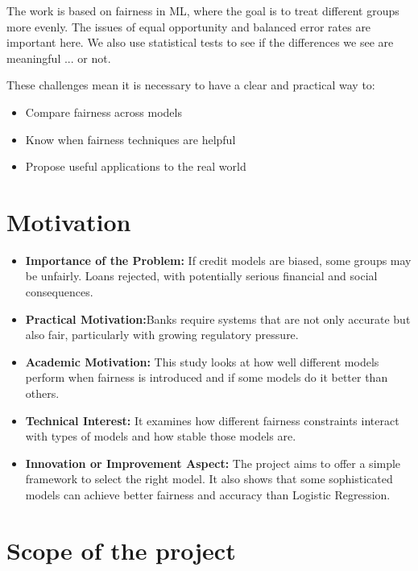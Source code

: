 The work is based on fairness in ML, where the goal is to treat different groups
more evenly. The issues of equal opportunity and balanced error rates are important here.
We also use statistical tests to see if the differences we see are meaningful
... or not.

These challenges mean it is necessary to have a clear and practical way to:
\begin{itemize}
    \item Compare fairness across models
    \item Know when fairness techniques are helpful
    \item Propose useful applications to the real world
\end{itemize}
\section{Motivation}

\begin{itemize}
    \item \textbf{Importance of the Problem:} If credit models are biased, some groups may be unfairly. Loans rejected, with potentially serious financial and social consequences.
    
    \item \textbf{Practical Motivation:}Banks require systems that are not only accurate but also fair, particularly with growing regulatory pressure.

    \item \textbf{Academic Motivation:} This study looks at how well different models perform when fairness is introduced and if some models do it better than others.
    
    \item \textbf{Technical Interest:} It examines how different fairness constraints interact with types of models and how stable those models are.
    
    \item \textbf{Innovation or Improvement Aspect:} The project aims to offer a simple framework to select the right model. It also shows that some sophisticated models can achieve better fairness and accuracy than Logistic Regression.
\end{itemize}

\section{Scope of the project}

